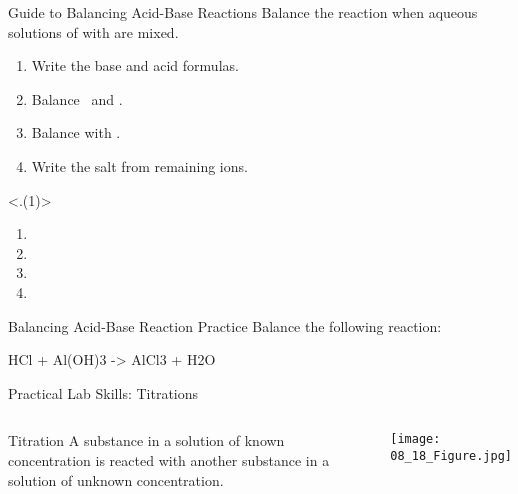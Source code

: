 \documentclass[notes=only]{beamer}
\begin{document}
\begin{frame}[t]{Guide to Balancing Acid-Base Reactions}
	Balance the reaction when aqueous solutions of  with
	 are mixed.

	\bigskip

	\begin{enumerate}[<+(1)->]
		\item Write the base and acid formulas.
		\item Balance \Hyd\ and .
		\item Balance with \water.
		\item Write the salt from remaining ions.
	\end{enumerate}

	\note<.(1)>{%
		\begin{enumerate}
			\item {}
			\item {}
			\item {}
			\item {}
		\end{enumerate}
		}
\end{frame}

\begin{frame}[t]{Balancing Acid-Base Reaction Practice}
	Balance the following reaction:
	\begin{reaction*}
		HCl\aq{} + Al(OH)3\aq{} -> AlCl3\aq{} + H2O\lqd
	\end{reaction*}
\end{frame}

%

\begin{frame}{Practical Lab Skills: Titrations}
	\begin{columns}
	\begin{block}{Titration}
		A substance in a solution of known concentration is reacted with
		another substance in a solution of unknown concentration.
	\end{block}

	\begin{center}
		\texttt{[image: 08\_18\_Figure.jpg]}
	\end{center}
\end{columns}
\end{frame}
\end{document}
